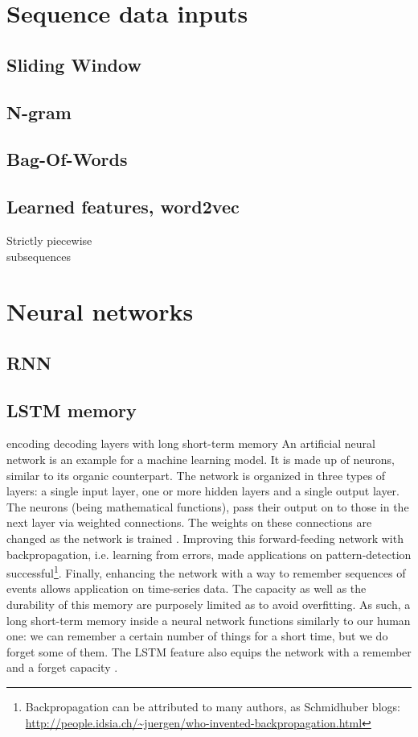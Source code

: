 \section{Sequence data inputs}
\subsection{Sliding Window}
\subsection{N-gram}
\subsection{Bag-Of-Words}
\subsection{Learned features, word2vec}
Strictly piecewise\\
subsequences

\section{Neural networks}
\subsection{RNN}
\subsection{LSTM memory}
encoding decoding layers with long short-term memory An artificial neural network is an example for a machine learning model. It is made up of neurons, similar to its organic counterpart. The network is organized in three types of layers: a single input layer, one or more hidden layers and a single output layer.
The neurons (being mathematical functions), pass their output on to those in the next layer via weighted connections. The weights on these connections are changed as the network is trained \cite{rosenblatt1958}.
Improving this forward-feeding network with backpropagation, i.e. learning from errors, made applications on pattern-detection successful\footnote{Backpropagation can be attributed to many authors, as Schmidhuber blogs: \url{http://people.idsia.ch/~juergen/who-invented-backpropagation.html}}.
Finally, enhancing the network with a way to remember sequences of events allows application on time-series data. The capacity as well as the durability of this memory are purposely limited as to avoid overfitting.
As such, a long short-term memory inside a neural network functions similarly to our human one: we can remember a certain number of things for a short time, but we do forget some of them.
The LSTM feature also equips the network with a remember and a forget capacity \cite{hochreiter1997}.